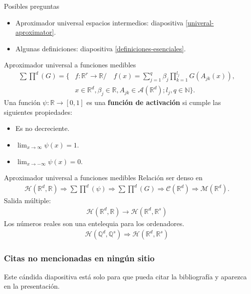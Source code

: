\documentclass{beamer}
\newcommand{\R}{\mathbb{R}}
\newcommand{\N}{\mathbb{N}}
\newcommand{\Q}{\mathbb{Q}}
\newcommand{\afines}{\mathcal{A}(\R^d)}
\newcommand{\pmcg}{ \sum \prod^d (G)} %
\newcommand{\fC}{\mathcal{C}(\R^d)} %
\newcommand{\fM}{\mathcal{M}(\R^d)} %
\newcommand{\rrnn}{ \mathcal{H}(\R^d,\R)} %
\newcommand{\rrnng}{ \sum \prod^d (\psi)} %
\newcommand{\rrnnmc}{ \mathcal{H}(\R^d,\R^s)}
\begin{document}
\begin{frame}{Posibles preguntas}
    \begin{itemize}
        \item Aproximador universal espacios intermedios: diapositiva \ref{univeral-aproximator}.
        \item Algunas definiciones: diapositiva \ref{definiciones-esenciales}.
    \end{itemize}
    
\end{frame}
\begin{frame}{Aproximador universal a funciones medibles}
    \label{definiciones-esenciales}
    \begin{align*} 
        \sum \prod^d(G) = \{ 
        &f: \R^r \longrightarrow \R / \quad
        f(x) = \sum_{j = 1} ^q  \beta_j \prod_{k=1}^{l_j}
        G(A_{jk}(x)), \\
        &x  \in \R^d, \beta_j \in \R, A_{jk}\in \afines; l_j,q \in \N
        \}.
    \end{align*} 
    Una función  $\psi: \R \longrightarrow [0,1]$ 
    es una \textbf{ función de activación} 
    si  cumple las siguientes propiedades:
    \begin{itemize}
        \item Es no decreciente.
        \item $\lim _{x \rightarrow \infty} \psi(x) = 1$.
        \item $\lim _{x \rightarrow -\infty} \psi(x) = 0$.
    \end{itemize}   
\end{frame}

\begin{frame}{Aproximador universal a funciones medibles}
    \label{univeral-aproximator}
    Relación ser denso en 
    \begin{align*}
        \rrnn 
            \Rightarrow  
        \rrnng 
            \Rightarrow
        \pmcg
            \Rightarrow  
        \fC    
            \Rightarrow 
        \fM .
    \end{align*}
    Salida múltiple: 
    \begin{align*}
        \rrnn 
            \longrightarrow 
        \rrnnmc
    \end{align*}
    Los números reales son una entelequia para los ordenadores. 
    \begin{align*}
       \mathcal{H}(\Q^d, \Q^s)
            \Rightarrow
        \rrnnmc
    \end{align*}
\end{frame}

\begin{frame}
    \frametitle{Citas no mencionadas en ningún sitio}

    Este cándida diapositiva está solo para que pueda citar la 
    bibliografía y aparezca en la presentación. 
    \cite{MostafaLearningFromData}
    \cite{the-elements-of-real-analysis}

\end{frame}
\end{document}
